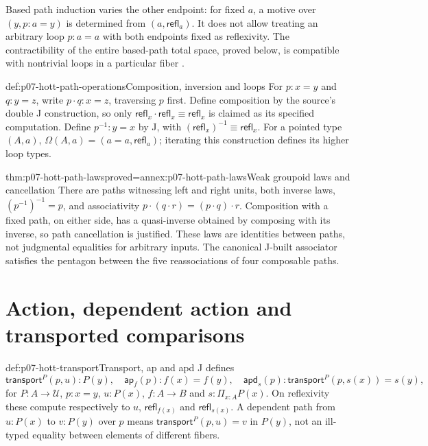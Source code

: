 Based path induction varies the other endpoint: for fixed $a$, a motive
over $(y,p:a=y)$ is determined from $(a,\mathsf{refl}_a)$. It does not
allow treating an arbitrary loop $p:a=a$ with both endpoints fixed as
reflexivity. The contractibility of the entire based-path total space,
proved below, is compatible with nontrivial loops in a particular fiber
\parencite[\S1.12; \S2.1]{HoTT2013PublicReleaseFoundations}.

\begin{hbdefinition}{def:p07-hott-path-operations}{Composition, inversion and loops}
For $p:x=y$ and $q:y=z$, write $p\cdot q:x=z$, traversing $p$ first.
Define composition by the source's double J construction, so only
$\mathsf{refl}_x\cdot\mathsf{refl}_x\equiv\mathsf{refl}_x$ is claimed
as its specified computation. Define $p^{-1}:y=x$ by J, with
$(\mathsf{refl}_x)^{-1}\equiv\mathsf{refl}_x$.
For a pointed type $(A,a)$, $\Omega(A,a)=(a=a,\mathsf{refl}_a)$;
iterating this construction defines its higher loop types.
\end{hbdefinition}

\begin{hbtheorem}{thm:p07-hott-path-laws}{proved=annex:p07-hott-path-laws}{Weak groupoid laws and cancellation}
There are paths witnessing left and right units, both inverse laws,
$(p^{-1})^{-1}=p$, and associativity
$p\cdot(q\cdot r)=(p\cdot q)\cdot r$.
Composition with a fixed path, on either side, has a quasi-inverse obtained
by composing with its inverse, so path cancellation is justified.
These laws are identities between paths, not judgmental equalities for
arbitrary inputs. The canonical J-built associator satisfies the pentagon
between the five reassociations of four composable paths.
\end{hbtheorem}

\section{Action, dependent action and transported comparisons}
\label{sec:p07-hott-transport}

\begin{hbdefinition}{def:p07-hott-transport}{Transport, ap and apd}
J defines
\[
 \mathsf{transport}^{P}(p,u):P(y),\quad
 \mathsf{ap}_f(p):f(x)=f(y),\quad
 \mathsf{apd}_s(p):\mathsf{transport}^{P}(p,s(x))=s(y),
\]
for $P:A\to\mathcal U$, $p:x=y$, $u:P(x)$, $f:A\to B$ and
$s:\Pi_{x:A}P(x)$. On reflexivity these compute respectively to
$u$, $\mathsf{refl}_{f(x)}$ and $\mathsf{refl}_{s(x)}$.
A dependent path from $u:P(x)$ to $v:P(y)$ over $p$ means
$\mathsf{transport}^{P}(p,u)=v$ in $P(y)$, not an ill-typed equality
between elements of different fibers.
\end{hbdefinition}

